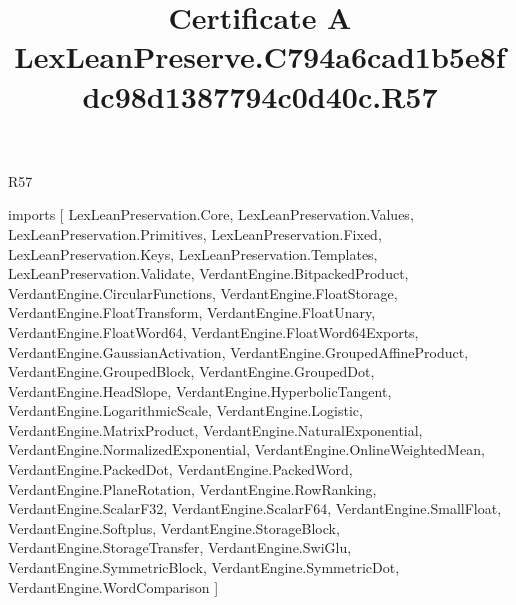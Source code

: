 \begin{lexlean}{R57}
\title{Certificate A LexLeanPreserve.C794a6cad1b5e8fdc98d1387794c0d40c.R57}
\begin{coremodule}
imports [
  LexLeanPreservation.Core,
  LexLeanPreservation.Values,
  LexLeanPreservation.Primitives,
  LexLeanPreservation.Fixed,
  LexLeanPreservation.Keys,
  LexLeanPreservation.Templates,
  LexLeanPreservation.Validate,
  VerdantEngine.BitpackedProduct,
  VerdantEngine.CircularFunctions,
  VerdantEngine.FloatStorage,
  VerdantEngine.FloatTransform,
  VerdantEngine.FloatUnary,
  VerdantEngine.FloatWord64,
  VerdantEngine.FloatWord64Exports,
  VerdantEngine.GaussianActivation,
  VerdantEngine.GroupedAffineProduct,
  VerdantEngine.GroupedBlock,
  VerdantEngine.GroupedDot,
  VerdantEngine.HeadSlope,
  VerdantEngine.HyperbolicTangent,
  VerdantEngine.LogarithmicScale,
  VerdantEngine.Logistic,
  VerdantEngine.MatrixProduct,
  VerdantEngine.NaturalExponential,
  VerdantEngine.NormalizedExponential,
  VerdantEngine.OnlineWeightedMean,
  VerdantEngine.PackedDot,
  VerdantEngine.PackedWord,
  VerdantEngine.PlaneRotation,
  VerdantEngine.RowRanking,
  VerdantEngine.ScalarF32,
  VerdantEngine.ScalarF64,
  VerdantEngine.SmallFloat,
  VerdantEngine.Softplus,
  VerdantEngine.StorageBlock,
  VerdantEngine.StorageTransfer,
  VerdantEngine.SwiGlu,
  VerdantEngine.SymmetricBlock,
  VerdantEngine.SymmetricDot,
  VerdantEngine.WordComparison
]


\end{coremodule}
\end{lexlean}
